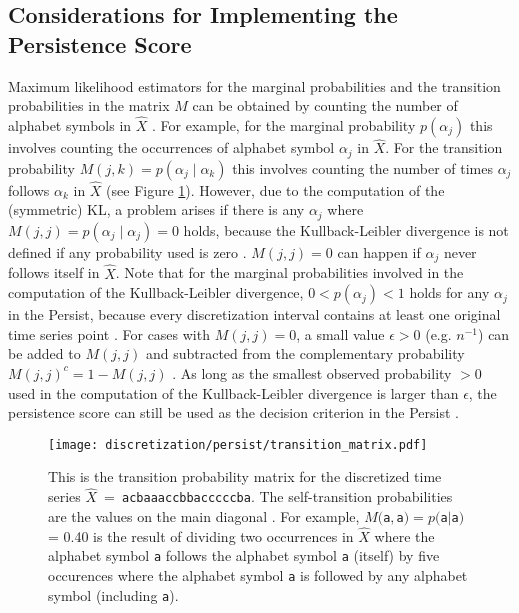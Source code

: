 \subsection*{Considerations for Implementing the Persistence Score}
Maximum likelihood estimators for the marginal probabilities and the transition probabilities in the matrix $M$ can be obtained by counting the number of alphabet symbols in $\hat{X}$ \cite{Persist}. For example, for the marginal probability $p(\alpha_j)$ this involves counting the occurrences of alphabet symbol $\alpha_j$ in $\hat{X}$. For the transition probability $M(j,k) = p(\alpha_j \mid \alpha_k)$ this involves counting the number of times $\alpha_j$ follows $\alpha_k$ in $\hat{X}$ (see Figure \ref{fig:transition_matrix}). \newline
However, due to the computation of the (symmetric) \ac{KL}, a problem arises if there is any $\alpha_j$ where $M(j,j) = p(\alpha_j \mid \alpha_j) = 0$ holds, because the Kullback-Leibler divergence is not defined if any probability used is zero \cite{Persist}. $M(j,j) = 0$ can happen if $\alpha_j$ never follows itself in $\hat{X}$. Note that for the marginal probabilities involved in the computation of the Kullback-Leibler divergence,  $0 < p(\alpha_j) < 1$ holds for any $\alpha_j$ in the Persist, because every discretization interval contains at least one original time series point \cite{Persist}. \newline
For cases with $M(j,j) = 0$, a small value $\epsilon > 0$ (e.g. $n^{-1}$) can be added to $M(j,j)$ and subtracted from the complementary probability $M(j,j)^c = 1 - M(j,j)$ \cite{Persist}. As long as the smallest observed probability $> 0$ used in the computation of the Kullback-Leibler divergence is larger than $\epsilon$, the persistence score can still be used as the decision criterion in the Persist \cite{Persist}.
\begin{figure}[htb]
\centering
\texttt{[image: discretization/persist/transition\_matrix.pdf]}
\caption[Persist - Transition Probability Matrix]{This is the transition probability matrix for the discretized time series \mbox{$\hat{X}$ = \texttt{acbaaaccbbacccccba}}. The self-transition probabilities are the values on the main diagonal \cite{Persist}. For example, $M($\texttt{a}$,$\texttt{a}$) = p($\texttt{a}$\mid$\texttt{a}$)$ = 0.40 is the result of dividing two occurrences in $\hat{X}$ where the alphabet symbol \texttt{a} follows the alphabet symbol \texttt{a} (itself) by five occurences where the alphabet symbol \texttt{a} is followed by any alphabet symbol (including \texttt{a}).}
\label{fig:transition_matrix}
\end{figure}
